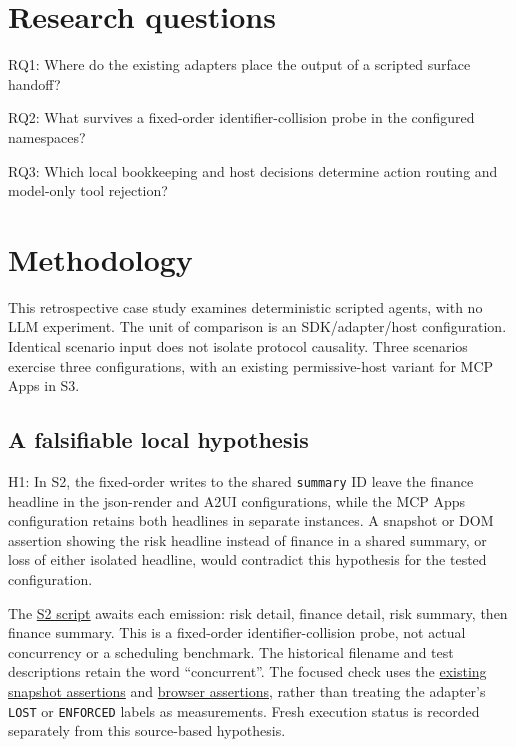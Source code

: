 \documentclass[11pt]{article}
\begin{document}
\section{Research questions}\label{research-questions}

RQ1: Where do the existing adapters place the output of a scripted
surface handoff?

RQ2: What survives a fixed-order identifier-collision probe in the
configured namespaces?

RQ3: Which local bookkeeping and host decisions determine action routing
and model-only tool rejection?

\section{Methodology}\label{methodology}

This retrospective case study examines deterministic scripted agents,
with no LLM experiment. The unit of comparison is an SDK/adapter/host
configuration. Identical scenario input does not isolate protocol
causality. Three scenarios exercise three configurations, with an
existing permissive-host variant for MCP Apps in S3.

\subsection{A falsifiable local
hypothesis}\label{a-falsifiable-local-hypothesis}

H1: In S2, the fixed-order writes to the shared \texttt{summary} ID
leave the finance headline in the json-render and A2UI configurations,
while the MCP Apps configuration retains both headlines in separate
instances. A snapshot or DOM assertion showing the risk headline instead
of finance in a shared summary, or loss of either isolated headline,
would contradict this hypothesis for the tested configuration.

The \href{../src/scenarios/s2-concurrent-composition.ts}{S2 script}
awaits each emission: risk detail, finance detail, risk summary, then
finance summary. This is a fixed-order identifier-collision probe, not
actual concurrency or a scheduling benchmark. The historical filename
and test descriptions retain the word ``concurrent''. The focused check
uses the \href{../tests/protocol/scenarios.test.ts}{existing snapshot
assertions} and \href{../tests/browser/render.spec.ts}{browser
assertions}, rather than treating the adapter's \texttt{LOST} or
\texttt{ENFORCED} labels as measurements. Fresh execution status is
recorded separately from this source-based hypothesis.
\end{document}
